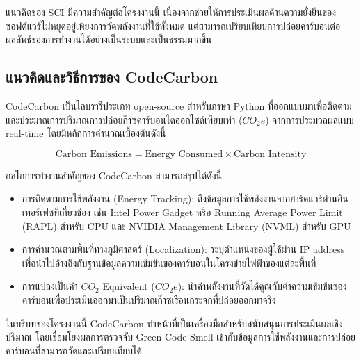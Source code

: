แนวคิดของ SCI มีความสำคัญต่อโครงงานนี้ เนื่องจากช่วยให้การประเมินผลด้านความยั่งยืนของซอฟต์แวร์ไม่หยุดอยู่เพียงการวัดพลังงานที่ใช้ทั้งหมด แต่สามารถเปรียบเทียบการปล่อยคาร์บอนต่อผลลัพธ์ของการทำงานได้อย่างเป็นระบบและเป็นธรรมมากขึ้น

\subsection{แนวคิดและวิธีการของ CodeCarbon}
CodeCarbon เป็นไลบรารีประเภท open-source สำหรับภาษา Python ที่ออกแบบมาเพื่อติดตามและประมาณการปริมาณการปล่อยก๊าซคาร์บอนไดออกไซด์เทียบเท่า ($CO_2e$) จากการประมวลผลแบบ real-time โดยมีหลักการคำนวณเบื้องต้นดังนี้~\cite{codecarbonMethodology}

\[
\text{Carbon Emissions} = \text{Energy Consumed} \times \text{Carbon Intensity}
\]

กลไกการทำงานสำคัญของ CodeCarbon สามารถสรุปได้ดังนี้
\begin{itemize}
    \item {\boldfont การติดตามการใช้พลังงาน (Energy Tracking)}: ดึงข้อมูลการใช้พลังงานจากฮาร์ดแวร์ผ่านอินเทอร์เฟซที่เกี่ยวข้อง เช่น Intel Power Gadget หรือ Running Average Power Limit (RAPL) สำหรับ CPU และ NVIDIA Management Library (NVML) สำหรับ GPU
    \item {\boldfont การคำนวณตามพื้นที่ทางภูมิศาสตร์ (Localization)}: ระบุตำแหน่งของผู้ใช้ผ่าน IP address เพื่อนำไปอ้างอิงกับฐานข้อมูลความเข้มข้นของคาร์บอนในโครงข่ายไฟฟ้าของแต่ละพื้นที่
    \item {\boldfont การแปลงเป็นค่า $CO_2$ Equivalent ($CO_2e$)}: นำค่าพลังงานที่วัดได้คูณกับค่าความเข้มข้นของคาร์บอนเพื่อประเมินออกมาเป็นปริมาณก๊าซเรือนกระจกที่ปล่อยออกมาจริง
\end{itemize}

ในบริบทของโครงงานนี้ CodeCarbon ทำหน้าที่เป็นเครื่องมือสำหรับสนับสนุนการประเมินผลเชิงปริมาณ โดยเชื่อมโยงผลการตรวจจับ Green Code Smell เข้ากับข้อมูลการใช้พลังงานและการปล่อยคาร์บอนที่สามารถวัดและเปรียบเทียบได้

